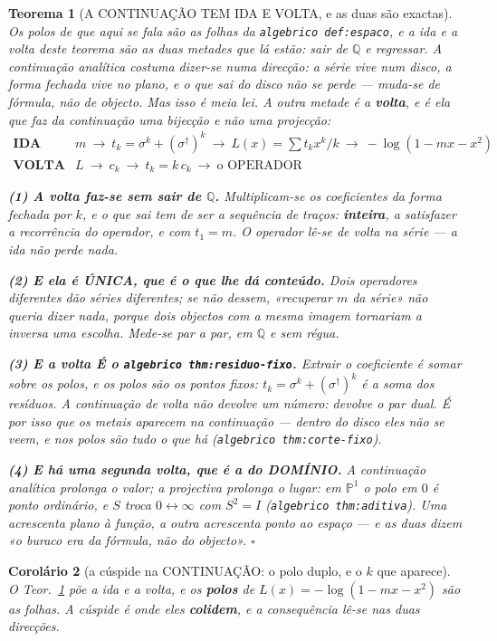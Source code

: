 \documentclass[11pt,a4paper]{article}
\newcommand{\code}[1]{\texttt{\small #1}}
\newtheorem{teorema}{Teorema}
\newtheorem{corolario}[teorema]{Corolário}
\newcommand{\dg}{^{\dagger}}
\begin{document}
\begin{teorema}[A CONTINUAÇÃO TEM IDA E VOLTA, e as duas são exactas]\label{thm:continuacao}
\emph{Os polos de que aqui se fala são as folhas da \code{algebrico def:espaco}}, e a ida e a
volta deste teorema são as duas metades que lá estão: sair de $\mathbb{Q}$ e regressar.
A continuação analítica costuma dizer-se numa direcção: a série vive num disco, a forma
fechada vive no plano, e o que sai do disco não se perde --- \emph{muda-se de fórmula, não
de objecto}. Mas isso é meia lei. A outra metade é a \textbf{volta}, e é ela que faz da
continuação uma \emph{bijecção} e não uma projecção:
\[
\boxed{
\begin{array}{ll}
\textbf{IDA} & m\ \longrightarrow\ t_k=\sigma^{k}+(\sigma\dg)^{k}\ \longrightarrow\
L(x)=\sum t_k x^{k}/k\ \longrightarrow\ -\log(1-mx-x^{2})\\[3pt]
\textbf{VOLTA} & L\ \longrightarrow\ c_k\ \longrightarrow\ t_k=k\,c_k\ \longrightarrow\
\text{o OPERADOR}
\end{array}}
\]

\textbf{(1) A volta faz-se sem sair de $\mathbb{Q}$.} Multiplicam-se os coeficientes da
forma fechada por $k$, e o que sai \emph{tem} de ser a sequência de traços: \textbf{inteira},
a satisfazer a recorrência do operador, e com $t_1=m$. \emph{O operador lê-se de volta na
série} --- a ida não perde nada.

\textbf{(2) E ela é ÚNICA, que é o que lhe dá conteúdo.} Dois operadores diferentes dão
séries diferentes; se não dessem, «recuperar $m$ da série» não queria dizer nada, porque
dois objectos com a mesma imagem tornariam a inversa uma \emph{escolha}. Mede-se par a
par, em $\mathbb{Q}$ e sem régua.

\textbf{(3) E a volta É o \code{algebrico thm:residuo-fixo}.} Extrair o coeficiente é somar
sobre os polos, e os polos \emph{são} os pontos fixos: $t_k=\sigma^{k}+(\sigma\dg)^{k}$ é a
soma dos resíduos. \emph{A continuação de volta não devolve um número: devolve o par
dual.} É por isso que os metais aparecem na continuação --- dentro do disco eles não se
veem, e nos polos são tudo o que há (\code{algebrico thm:corte-fixo}).

\textbf{(4) E há uma segunda volta, que é a do DOMÍNIO.} A continuação analítica prolonga
o \emph{valor}; a projectiva prolonga o \emph{lugar}: em $\mathbb{P}^1$ o polo em $0$ é
ponto ordinário, e $S$ troca $0\leftrightarrow\infty$ com $S^{2}=I$
(\code{algebrico thm:aditiva}). \emph{Uma acrescenta plano à função, a outra acrescenta ponto
ao espaço} --- e as duas dizem «o buraco era da fórmula, não do objecto». $\square$
\end{teorema}\begin{corolario}[a cúspide na CONTINUAÇÃO: o polo duplo, e o $k$ que
aparece]\label{cor:cuspide-continuacao}
O Teor.~\ref{thm:continuacao} põe a ida e a volta, e os \textbf{polos} de
$L(x)=-\log(1-mx-x^{2})$ são as folhas. A cúspide é onde eles \textbf{colidem}, e a
consequência lê-se nas duas direcções.


\end{corolario}
\end{document}
